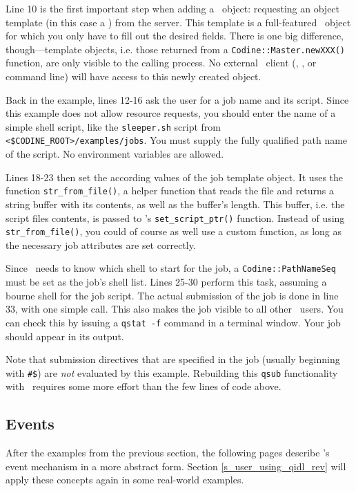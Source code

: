 Line 10 is the first important step when adding a \qidl\ object: requesting an 
object template (in this case a \job) from the server. This template is a
full-featured \qidl\ object for which you only have to fill out the desired
fields. There is one big difference, though---template objects, i.e. those
returned from a \texttt{Codine::Master.newXXX()} function, are only visible
to the calling process. No external \codine\ client (\qidl, \codapi, or
command line) will have access to this newly created object.

Back in the example, lines 12-16 ask the user for a job name and its script.
Since this example does not allow resource requests, you should enter the
name of a simple shell script, like the \texttt{sleeper.sh} script from
\texttt{<\$CODINE\_ROOT>/\-examples/\-jobs}. You must supply the fully qualified
path name of the script. No environment variables are allowed.

Lines 18-23 then set the according values of the job template object. It uses
the function \texttt{str\_from\_file()}, a helper function that reads the file
and returns a string buffer with its contents, as well as the buffer's
length. This buffer, i.e. the script files contents, is passed to \job's
\texttt{set\_script\_ptr()} function. Instead of using
\texttt{str\_from\_file()}, you could of course as well use a custom function,
as long as the necessary job attributes are set correctly.

Since \codine\ needs to know which shell to start for the job, a
\texttt{Codine::\-PathNameSeq} must be set as the job's shell list. Lines 25-30
perform this task, assuming a bourne shell for the job script.
The actual submission of the job is done in line 33, with one simple call.
This also makes the job visible to all other \codine\ users. You can check this
by issuing a \texttt{qstat -f} command in a terminal window. Your job should
appear in its output.

Note that submission directives that are specified in the job (usually
beginning with \texttt{\#\$}) are \emph{not} evaluated by this example.
Rebuilding this \texttt{qsub} functionality with \qidl\ requires some more
effort than the few lines of code above.

\subsection{\label{s_user_events}Events}
After the examples from the previous section, the following pages describe
\qidl's event mechanism in a more abstract form. Section
\ref{s_user_using_qidl_rev} will apply these concepts again in some
real-world examples.

